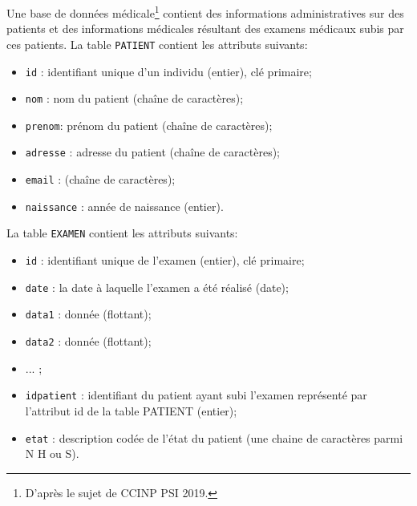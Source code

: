 Une base de données médicale\footnote{D'après le sujet de CCINP PSI 2019.} contient des informations administratives sur des patients et des informations médicales résultant des examens médicaux subis par ces patients.\newline
La table \texttt{PATIENT} contient les attributs suivants:
\begin{itemize}
 \item \texttt{id} : identifiant unique d'un individu (entier), clé primaire;
 \item \texttt{nom} : nom du patient (chaîne de caractères);
 \item \texttt{prenom}: prénom du patient (chaîne de caractères);
 \item \texttt{adresse} : adresse du patient (chaîne de caractères);
 \item \texttt{email} : (chaîne de caractères);
 \item \texttt{naissance} : année de naissance (entier).
\end{itemize}
La table \texttt{EXAMEN} contient les attributs suivants:
\begin{itemize}
 \item \texttt{id} : identifiant unique de l'examen (entier), clé primaire;
 \item \texttt{date} : la date à laquelle l'examen a été réalisé (date);
 \item \texttt{data1} : donnée (flottant);
 \item \texttt{data2} : donnée (flottant);
 \item ... ;
 \item \texttt{idpatient} : identifiant du patient ayant subi l'examen représenté par l'attribut id de la table PATIENT (entier);
 \item \texttt{etat} : description codée de l'état du patient (une chaine de caractères parmi N H ou S).
\end{itemize}

